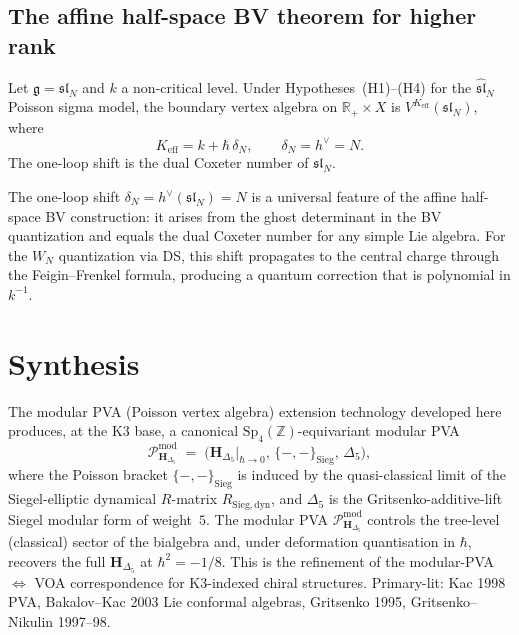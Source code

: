 \subsection{The affine half-space BV theorem for higher rank}

\begin{theorem}
Let $\mathfrak{g} = \mathfrak{sl}_N$ and $k$ a non-critical level.
Under Hypotheses~(H1)--(H4) for the $\widehat{\mathfrak{sl}}_N$
Poisson sigma model, the boundary vertex algebra on
$\mathbb{R}_+ \times X$ is $V^{K_{\mathrm{eff}}}(\mathfrak{sl}_N)$,
where
\[
K_{\mathrm{eff}} = k + \hbar\,\delta_N,
\qquad
\delta_N = h^\vee = N.
\]
The one-loop shift is the dual Coxeter number of $\mathfrak{sl}_N$.
\end{theorem}

\begin{remark}
The one-loop shift $\delta_N = h^\vee(\mathfrak{sl}_N) = N$ is a universal
feature of the affine half-space BV construction: it arises from the
ghost determinant in the BV quantization and equals the dual Coxeter
number for any simple Lie algebra. For the $W_N$ quantization via DS,
this shift propagates to the central charge through the Feigin--Frenkel
formula, producing a quantum correction that is polynomial in $k^{-1}$.
\end{remark}

\section{Synthesis}
\label{sec:modpva-ext-supplement}

\begin{remark}
\label{rem:modpva-ext-1}
The modular PVA (Poisson vertex algebra) extension technology developed
here produces, at the K3 base, a canonical $\mathrm{Sp}_4(\mathbb Z)$-equivariant
modular PVA
\[
\mathcal P_{\mathbf H_{\Delta_5}}^{\mathrm{mod}} \;=\; \bigl(\mathbf H_{\Delta_5}|_{\hbar\to 0},\, \{-,-\}_{\mathrm{Sieg}},\, \Delta_5\bigr),
\]
where the Poisson bracket $\{-,-\}_{\mathrm{Sieg}}$ is induced by the
quasi-classical limit of the Siegel-elliptic dynamical $R$-matrix
$R_{\mathrm{Sieg,dyn}}$, and $\Delta_5$ is the Gritsenko-additive-lift
Siegel modular form of weight~$5$. The modular PVA $\mathcal P_{\mathbf H_{\Delta_5}}^{\mathrm{mod}}$
controls the tree-level (classical) sector of the bialgebra
and, under deformation quantisation in $\hbar$, recovers the full
$\mathbf H_{\Delta_5}$ at $\hbar^2 = -1/8$. This is the refinement
of the modular-PVA $\Leftrightarrow$ VOA correspondence for K3-indexed
chiral structures. Primary-lit: Kac 1998 PVA, Bakalov--Kac 2003 Lie
conformal algebras, Gritsenko 1995, Gritsenko--Nikulin 1997--98.
\end{remark}
